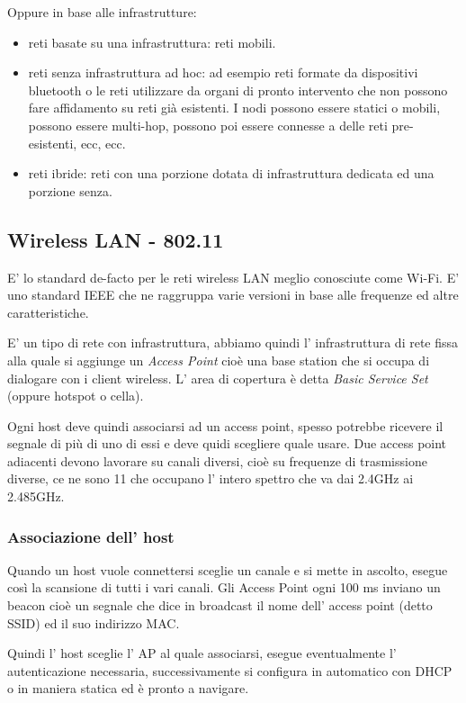 Oppure in base alle infrastrutture:
\begin{itemize}
    \item reti basate su una infrastruttura: reti mobili.

    \item reti senza infrastruttura ad hoc: ad esempio reti formate da dispositivi bluetooth o le reti utilizzare da organi di pronto intervento che non possono fare affidamento su reti già esistenti.
    I nodi possono essere statici o mobili, possono essere multi-hop, possono poi essere connesse a delle reti pre-esistenti, ecc, ecc.

    \item reti ibride: reti con una porzione dotata di infrastruttura dedicata ed una porzione senza.
\end{itemize}

\subsection{Wireless LAN - 802.11}
E' lo standard de-facto per le reti wireless LAN meglio conosciute come Wi-Fi.
E' uno standard IEEE che ne raggruppa varie versioni in base alle frequenze ed altre caratteristiche.

E' un tipo di rete con infrastruttura, abbiamo quindi l' infrastruttura di rete fissa alla quale si aggiunge un \emph{Access Point} cioè una base station che si occupa di dialogare con i client wireless.
L' area di copertura è detta \emph{Basic Service Set} (oppure hotspot o cella).

Ogni host deve quindi associarsi ad un access point, spesso potrebbe ricevere il segnale di più di uno di essi e deve quidi scegliere quale usare.
Due access point adiacenti devono lavorare su canali diversi, cioè su frequenze di trasmissione diverse, ce ne sono 11 che occupano l' intero spettro che va dai 2.4GHz ai 2.485GHz.

\subsubsection{Associazione dell' host}
Quando un host vuole connettersi sceglie un canale e si mette in ascolto, esegue così la scansione di tutti i vari canali.
Gli Access Point ogni 100 ms inviano un beacon cioè un segnale che dice in broadcast il nome dell' access point (detto SSID) ed il suo indirizzo MAC.

Quindi l' host sceglie l' AP al quale associarsi, esegue eventualmente l' autenticazione necessaria, successivamente si configura in automatico con DHCP o in maniera statica ed è pronto a navigare.

